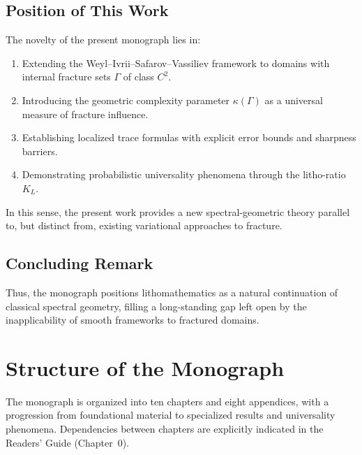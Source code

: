 \subsection*{Position of This Work}

The novelty of the present monograph lies in:

\begin{enumerate}[label=\textbf{N\arabic*}]
    \item Extending the Weyl--Ivrii--Safarov--Vassiliev framework to domains 
    with internal fracture sets $\Gamma$ of class $C^2$.
    \item Introducing the geometric complexity parameter $\kappa(\Gamma)$ as a 
    universal measure of fracture influence.
    \item Establishing localized trace formulas with explicit error bounds 
    and sharpness barriers.
    \item Demonstrating probabilistic universality phenomena through the 
    litho-ratio $K_L$.
\end{enumerate}

In this sense, the present work provides a new spectral-geometric theory 
parallel to, but distinct from, existing variational approaches to fracture. 

\subsection*{Concluding Remark}

Thus, the monograph positions lithomathematics as a natural continuation of 
classical spectral geometry, filling a long-standing gap left open by the 
inapplicability of smooth frameworks to fractured domains.



\section{Structure of the Monograph}

The monograph is organized into ten chapters and eight appendices, with a 
progression from foundational material to specialized results and universality 
phenomena. Dependencies between chapters are explicitly indicated in the 
Readers' Guide (Chapter~0).

